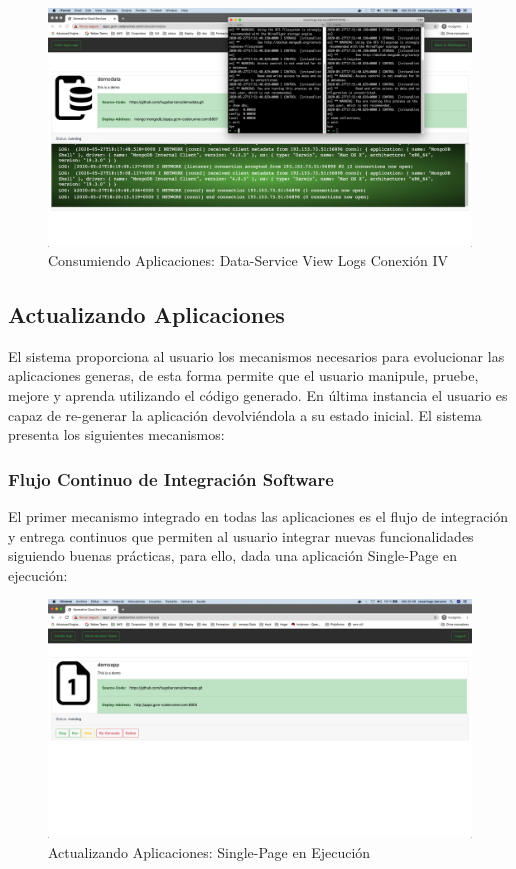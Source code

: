 \documentclass[a4paper,11pt]{book}
\begin{document}
\begin{figure}[H]
\centering
\includegraphics[scale=0.2]{imagenes/casouso/1_17.png}
\caption{ Consumiendo Aplicaciones: Data-Service View Logs Conexión IV   }
\end{figure}



\subsection{Actualizando Aplicaciones}

El sistema proporciona al usuario los mecanismos necesarios para evolucionar las aplicaciones generas, de esta forma permite que el usuario manipule, pruebe, mejore y aprenda utilizando el código generado. En última instancia el usuario es capaz de re-generar la aplicación devolviéndola a su estado inicial. El sistema presenta los siguientes mecanismos:

\subsubsection{Flujo Continuo de Integración Software}

El primer mecanismo integrado en todas las aplicaciones es el flujo de integración y entrega continuos que permiten al usuario integrar nuevas funcionalidades siguiendo buenas prácticas, para ello, dada una aplicación Single-Page en ejecución:

\begin{figure}[H]
\centering
\includegraphics[scale=0.2]{imagenes/casouso/2_1.png}
\caption{ Actualizando Aplicaciones: Single-Page en Ejecución  }
\end{figure}
\end{document}
